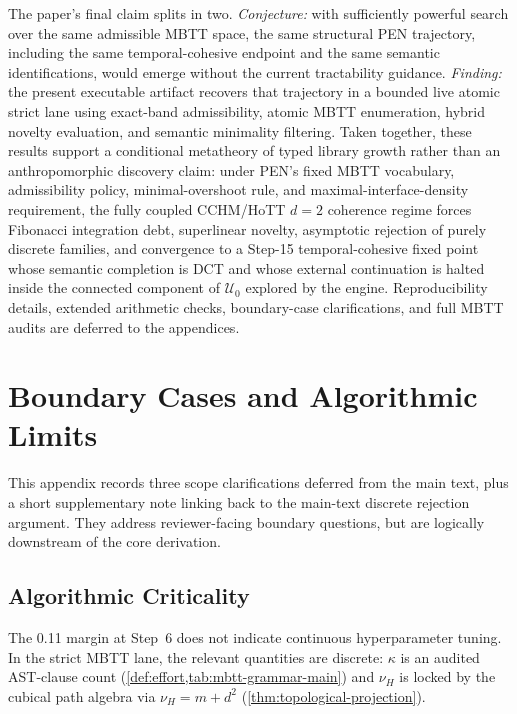 \documentclass[11pt,a4paper]{article}
\theoremstyle{plain}
\theoremstyle{definition}
\theoremstyle{remark}
\newcommand{\U}{\mathcal{U}}
\begin{document}
The paper's final claim splits in two.
\emph{Conjecture:} with sufficiently powerful search over the same admissible MBTT space, the same structural PEN trajectory, including the same temporal-cohesive endpoint and the same semantic identifications, would emerge without the current tractability guidance.
\emph{Finding:} the present executable artifact recovers that trajectory in a bounded live atomic strict lane using exact-band admissibility, atomic MBTT enumeration, hybrid novelty evaluation, and semantic minimality filtering.
Taken together, these results support a conditional metatheory of typed library growth rather than an anthropomorphic discovery claim: under PEN's fixed MBTT vocabulary, admissibility policy, minimal-overshoot rule, and maximal-interface-density requirement, the fully coupled CCHM/HoTT $d=2$ coherence regime forces Fibonacci integration debt, superlinear novelty, asymptotic rejection of purely discrete families, and convergence to a Step-15 temporal-cohesive fixed point whose semantic completion is DCT and whose external continuation is halted inside the connected component of $\U_0$ explored by the engine.
Reproducibility details, extended arithmetic checks, boundary-case clarifications, and full MBTT audits are deferred to the appendices.

\appendix

\section{Boundary Cases and Algorithmic Limits}
\label{sec:boundaries}

This appendix records three scope clarifications deferred from the main text, plus a short supplementary note linking back to the main-text discrete rejection argument.
They address reviewer-facing boundary questions, but are logically downstream of the core derivation.

\subsection{Algorithmic Criticality}
\label{sec:criticality}

The 0.11 margin at Step~6 does not indicate continuous hyperparameter tuning.
In the strict MBTT lane, the relevant quantities are discrete: $\kappa$ is an audited AST-clause count (\cref{def:effort,tab:mbtt-grammar-main}) and $\nu_H$ is locked by the cubical path algebra via $\nu_H = m + d^2$ (\cref{thm:topological-projection}).
\end{document}
